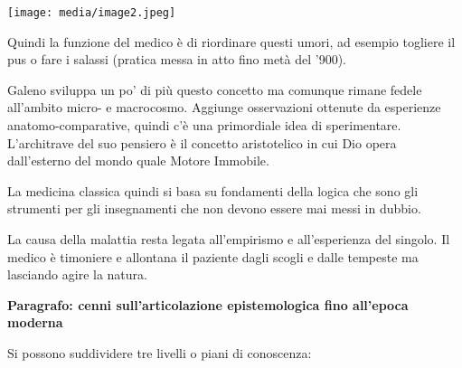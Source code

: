 \documentclass[]{article}
\begin{document}
\begin{itemize}
  \texttt{[image: media/image2.jpeg]}

  Quindi la funzione del medico è di riordinare questi umori, ad esempio
  togliere il pus o fare i salassi (pratica messa in atto fino metà del
  '900).

  Galeno sviluppa un po' di più questo concetto ma comunque rimane
  fedele all'ambito micro- e macrocosmo. Aggiunge osservazioni ottenute
  da esperienze anatomo-comparative, quindi c'è una primordiale idea di
  sperimentare. L'architrave del suo pensiero è il concetto aristotelico
  in cui Dio opera dall'esterno del mondo quale Motore Immobile.

  La medicina classica quindi si basa su fondamenti della logica che
  sono gli strumenti per gli insegnamenti che non devono essere mai
  messi in dubbio.

  La causa della malattia resta legata all'empirismo e all'esperienza
  del singolo. Il medico è timoniere e allontana il paziente dagli
  scogli e dalle tempeste ma lasciando agire la natura.

  \textbf{Paragrafo: cenni sull'articolazione epistemologica fino
  all'epoca moderna}

  Si possono suddividere tre livelli o piani di conoscenza:
\end{itemize}
\end{document}

